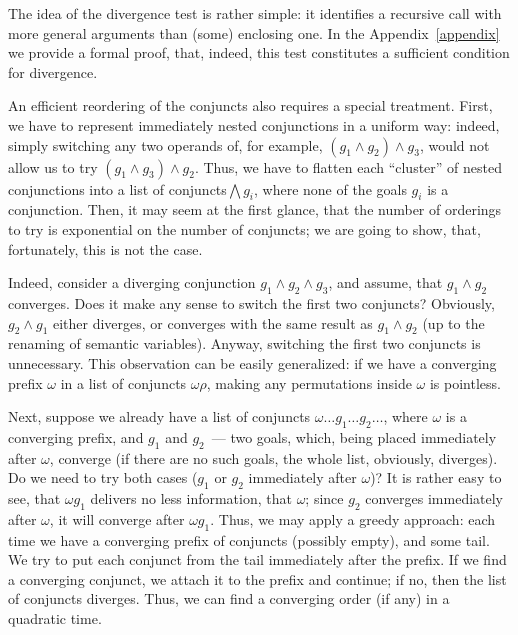 The idea of the divergence test is rather simple: it identifies a recursive call with more general arguments 
than (some) enclosing one. In the Appendix~\ref{appendix} we provide a formal proof, that, indeed,
this test constitutes a sufficient condition for divergence.

An efficient reordering of the conjuncts also requires a special treatment. First, we have to represent immediately nested conjunctions in a 
uniform way: indeed, simply switching any two operands of, for example, \mbox{$(g_1\wedge g_2)\wedge g_3$}, would not 
allow us to try \mbox{$(g_1\wedge g_3)\wedge g_2$}. Thus, we have to flatten each ``cluster'' of nested conjunctions into a list of conjuncts\mbox{$\bigwedge g_i$}, 
where none of the goals $g_i$ is a conjunction. Then, it may seem at the first glance, that the number of orderings to try 
is exponential on the number of conjuncts; we are going to show, that, fortunately, this is not the case. 

Indeed, consider a diverging conjunction \mbox{$g_1\wedge g_2\wedge g_3$}, and assume, that \mbox{$g_1\wedge g_2$} converges. 
Does it make any sense to switch the first two conjuncts? Obviously, \mbox{$g_2\wedge g_1$} either diverges, or converges with the same 
result as \mbox{$g_1\wedge g_2$} (up to the renaming of semantic variables). Anyway, switching the first two conjuncts is
unnecessary. This observation can be easily generalized: if we have a converging prefix $\omega$ in a list of conjuncts $\omega\rho$, making
any permutations inside $\omega$ is pointless.

Next, suppose we already have a list of conjuncts \mbox{$\omega\dots g_1\dots g_2\dots$}, where $\omega$ is a converging prefix, and
$g_1$ and $g_2$~--- two goals, which, being placed immediately after $\omega$, converge (if there are no such
goals, the whole list, obviously, diverges). Do we need to try both cases ($g_1$ or $g_2$ immediately after $\omega$)? 
It is rather easy to see, that \mbox{$\omega g_1$} delivers no less information, that \mbox{$\omega$}; since
$g_2$ converges immediately after $\omega$, it will converge after \mbox{$\omega g_1$}. Thus, we may apply a greedy approach: each
time we have a converging prefix of conjuncts (possibly empty), and some tail. We try to put each conjunct from the tail 
immediately after the prefix. If we find a converging conjunct, we attach it to the prefix and continue; if no, then the list of 
conjuncts diverges. Thus, we can find a converging order (if any) in a quadratic time.

